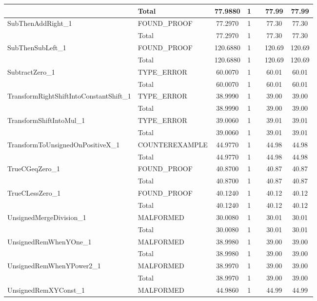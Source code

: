 \begin{appendices}
\begin{longtable}{L{0.25\textwidth} L{0.2\textwidth}  c  c  c  c  c }
    & Total & 77.9880 & 1 &  & 77.99 & 77.99 \\ \midrule 
    SubThenAddRight\_1 & FOUND\_PROOF & 77.2970 & 1 &  & 77.30 & 77.30 \\ \midrule 
    & Total & 77.2970 & 1 &  & 77.30 & 77.30 \\ \midrule 
    SubThenSubLeft\_1 & FOUND\_PROOF & 120.6880 & 1 &  & 120.69 & 120.69 \\ \midrule 
    & Total & 120.6880 & 1 &  & 120.69 & 120.69 \\ \midrule 
    SubtractZero\_1 & TYPE\_ERROR & 60.0070 & 1 &  & 60.01 & 60.01 \\ \midrule 
    & Total & 60.0070 & 1 &  & 60.01 & 60.01 \\ \midrule 
    TransformRightShiftIntoConstantShift\_1 & TYPE\_ERROR & 38.9990 & 1 &  & 39.00 & 39.00 \\ \midrule 
    & Total & 38.9990 & 1 &  & 39.00 & 39.00 \\ \midrule 
    TransformShiftIntoMul\_1 & TYPE\_ERROR & 39.0060 & 1 &  & 39.01 & 39.01 \\ \midrule 
    & Total & 39.0060 & 1 &  & 39.01 & 39.01 \\ \midrule 
    TransformToUnsignedOnPositiveX\_1 & COUNTEREXAMPLE & 44.9770 & 1 &  & 44.98 & 44.98 \\ \midrule 
    & Total & 44.9770 & 1 &  & 44.98 & 44.98 \\ \midrule 
    TrueCGeqZero\_1 & FOUND\_PROOF & 40.8700 & 1 &  & 40.87 & 40.87 \\ \midrule 
    & Total & 40.8700 & 1 &  & 40.87 & 40.87 \\ \midrule 
    TrueCLessZero\_1 & FOUND\_PROOF & 40.1240 & 1 &  & 40.12 & 40.12 \\ \midrule 
    & Total & 40.1240 & 1 &  & 40.12 & 40.12 \\ \midrule 
    UnsignedMergeDivision\_1 & MALFORMED & 30.0080 & 1 &  & 30.01 & 30.01 \\ \midrule 
    & Total & 30.0080 & 1 &  & 30.01 & 30.01 \\ \midrule 
    UnsignedRemWhenYOne\_1 & MALFORMED & 38.9980 & 1 &  & 39.00 & 39.00 \\ \midrule 
    & Total & 38.9980 & 1 &  & 39.00 & 39.00 \\ \midrule 
    UnsignedRemWhenYPower2\_1 & MALFORMED & 38.9970 & 1 &  & 39.00 & 39.00 \\ \midrule 
    & Total & 38.9970 & 1 &  & 39.00 & 39.00 \\ \midrule 
    UnsignedRemXYConst\_1 & MALFORMED & 44.9860 & 1 &  & 44.99 & 44.99 \\ \midrule 

\end{longtable}
\end{appendices}

